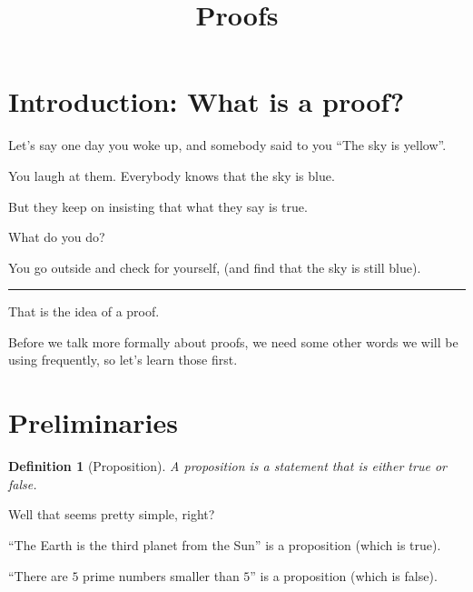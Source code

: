 \documentclass{article}
\title{Proofs}
\newtheorem{definition}{Definition}
\begin{document}
\maketitle

\section{Introduction: What is a proof?}
Let's say one day you woke up, and somebody said to you
``The sky is yellow''.

You laugh at them.
Everybody knows that the sky is blue.

But they keep on insisting that what they say is true.

What do you do?

You go outside and check for yourself, 
(and find that the sky is still blue).

\rule{\textwidth}{0.25pt}

That is the idea of a proof.

Before we talk more formally about proofs, we need some other
words we will be using frequently, so let's learn those first.

\section{Preliminaries}

\begin{definition}[Proposition]
	A proposition is a statement that is either true or false.
\end{definition}

Well that seems pretty simple, right?

``The Earth is the third planet from the Sun''
is a proposition (which is true).

``There are $5$ prime numbers smaller than $5$''
is a proposition (which is false).

\vspace{1em}
\end{document}
